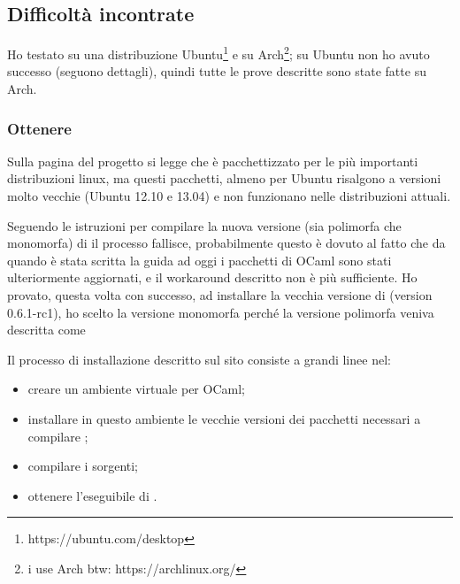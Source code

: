 \subsection{Difficoltà incontrate}
Ho testato \cduce su una distribuzione Ubuntu\footnote{https://ubuntu.com/desktop} e su Arch\footnote{i use Arch btw: https://archlinux.org/}; su Ubuntu non ho avuto successo (seguono dettagli), quindi tutte le prove descritte sono state fatte su Arch.
\subsubsection{Ottenere \cduce}
Sulla pagina del progetto si legge che \cduce è pacchettizzato per le più importanti distribuzioni linux, ma questi pacchetti, almeno per Ubuntu risalgono a versioni molto vecchie (Ubuntu 12.10 e 13.04) e non funzionano nelle distribuzioni attuali.

Seguendo le istruzioni per compilare la nuova versione (sia polimorfa che monomorfa) di \cduce il processo fallisce, probabilmente questo è dovuto al fatto che da quando è stata scritta la guida ad oggi i pacchetti di OCaml sono stati ulteriormente aggiornati, e il workaround descritto non è più sufficiente. Ho provato, questa volta con successo, ad installare la vecchia versione di \cduce (version 0.6.1-rc1), ho scelto la versione monomorfa perché la versione polimorfa veniva descritta come 

Il processo di installazione descritto sul sito consiste a grandi linee nel:
\begin{itemize}
	\item creare un ambiente virtuale per OCaml;
	\item installare in questo ambiente le vecchie versioni dei pacchetti necessari a compilare \cduce;
	\item compilare i sorgenti;
	\item ottenere l'eseguibile di \cduce.
\end{itemize}
